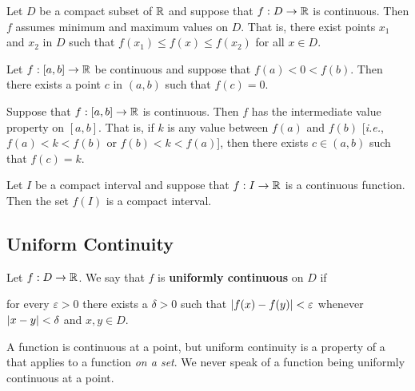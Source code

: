 \documentclass[12pt]{article}
\begin{document}
\begin{corollary}
  Let $D$ be a compact subset of $\mathbb{R}$ and suppose that $f : D \rightarrow
  \mathbb{R}$ is continuous. Then $f$ assumes minimum and maximum values on $D$. That
  is, there exist points $x_1$ and $x_2$ in $D$ such that $f(x_1) \le f(x) \le
  f(x_2)$ for all $x \in D$.
\end{corollary}

\begin{lemma}
  Let $f : [a,b] \rightarrow \mathbb{R}$ be continuous and suppose that $f(a) < 0 <
  f(b)$. Then there exists a point $c$ in $(a,b)$ such that $f(c) = 0$.
\end{lemma}

\begin{definition}
  Suppose that $f : [a,b] \rightarrow \mathbb{R}$ is continuous. Then $f$ has the
  intermediate value property on $[a,b]$. That is, if $k$ is any value between
  $f(a)$ and $f(b)$ [\textit{i.e.}, $f(a) < k < f(b)$ or $f(b) < k < f(a)$],
  then there exists $c \in (a,b)$ such that $f(c) = k$.
\end{definition}

\begin{theorem}
  Let $I$ be a compact interval and suppose that $f : I \rightarrow \mathbb{R}$ is a continuous
  function. Then the set $f(I)$ is a compact interval.
\end{theorem}

\subsection{Uniform Continuity}
\label{sec:org6f67e02}
\begin{definition}
  Let $f : D \rightarrow \mathbb{R}$. We say that $f$ is \textbf{uniformly continuous} on
  $D$ if
  \begin{center}
    for every $\varepsilon > 0$ there exists a $\delta > 0$ such that $\left|f(x)
      - f(y)\right| < \varepsilon$ whenever $\left|x - y\right| < \delta$ and $x,y \in D$.
  \end{center}
  A function is continuous at a point, but uniform continuity is a property of a
  that applies to a function \textit{on a set}. We never speak of a function
  being uniformly continuous at a point.
\end{definition}
\end{document}
